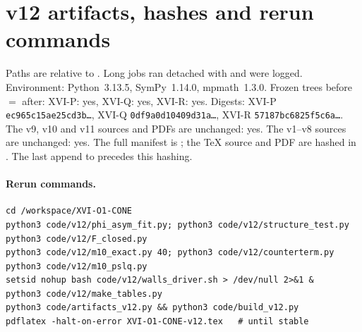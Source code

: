 
\section{v12 artifacts, hashes and rerun commands}
\label{app:v12artifacts}

Paths are relative to . Long jobs ran
detached with  and were logged. Environment: Python~3.13.5, SymPy~1.14.0, mpmath~1.3.0.
Frozen trees before \(=\) after: XVI-P: yes, XVI-Q: yes, XVI-R: yes.
Digests: XVI-P \texttt{ec965c15ae25cd3b\ldots}, XVI-Q \texttt{0df9a0d10409d31a\ldots}, XVI-R \texttt{57187bc6825f5c6a\ldots}.
The v9, v10 and v11 sources and PDFs are unchanged: yes. The v1--v8 sources are unchanged: yes.
The full manifest is ; the \TeX{} source and PDF are hashed in .
The last append to  precedes this hashing.

\paragraph{Rerun commands.}
\begin{verbatim}
cd /workspace/XVI-O1-CONE
python3 code/v12/phi_asym_fit.py; python3 code/v12/structure_test.py
python3 code/v12/F_closed.py
python3 code/v12/m10_exact.py 40; python3 code/v12/counterterm.py
python3 code/v12/m10_pslq.py
setsid nohup bash code/v12/walls_driver.sh > /dev/null 2>&1 &
python3 code/v12/make_tables.py
python3 code/artifacts_v12.py && python3 code/build_v12.py
pdflatex -halt-on-error XVI-O1-CONE-v12.tex   # until stable
\end{verbatim}

